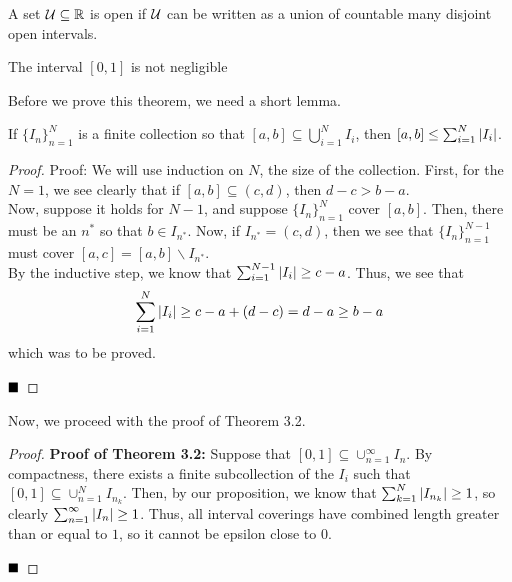 
\begin{lemma}
    A set $\cal{U} \subseteq \R$ is open if $\cal{U}$ can be written as a union of countable many disjoint open intervals.
\end{lemma}

\begin{theorem}
    The interval $[0, 1]$ is not negligible
\end{theorem}
Before we prove this theorem, we need a short lemma.

\begin{lemma}
    If $\{I_n\}_{n = 1}^{N}$ is a finite collection so that $[a, b] \subseteq \bigcup_{i = 1}^{N} I_{i}$, then $[a, b] \leq \sum_{i = 1}^{N} \abs{I_{i}}$. 
\end{lemma}
\begin{proof}{Proof:}
    We will use induction on $N$, the size of the collection. First, for the $N = 1$, we see clearly that if $[a, b] \subseteq (c, d)$, then $d - c > b - a$.\\

    Now, suppose it holds for $N - 1$, and suppose $\{I_{n}\}_{n = 1}^{N}$ cover $[a, b]$. Then, there must be an $n^{*}$ so that $b \in I_{n^*}$. Now, if $I_{n^{*}} = (c, d)$, then we see that $\{I_{n}\}_{n = 1}^{N - 1}$ must cover $[a, c] = [a, b] \backslash I_{n^{*}}$.\\

    By the inductive step, we know that $\sum_{i = 1}^{N - 1} \abs{I_{i}} \geq c - a$. Thus, we see that
    \[ \sum_{i = 1}^{N} \abs{I_{i}} \geq c - a + (d - c) = d - a \geq b - a \]
    which was to be proved.

    $\qed$
\end{proof}

Now, we proceed with the proof of Theorem 3.2.\\

\begin{proof}{\textbf{Proof of Theorem 3.2:}}
    Suppose that $[0, 1] \subseteq \cup_{n = 1}^{\infty} I_{n}$. By compactness, there exists a finite subcollection of the $I_{i}$ such that $[0, 1] \subseteq \cup_{n = 1}^{N} I_{n_k}$. Then, by our proposition, we know that $\sum_{k = 1}^{N} \abs{I_{n_k}} \geq 1$, so clearly $\sum_{n = 1}^{\infty} \abs{I_{n}} \geq 1$. Thus, all interval coverings have combined length greater than or equal to $1$, so it cannot be epsilon close to $0$. 

    $\qed$
\end{proof}

